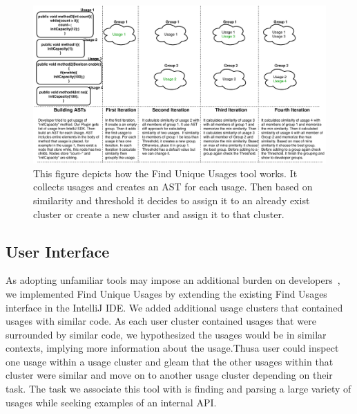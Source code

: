 \documentclass[conference]{IEEEtran}
\begin{document}
\begin{figure}
    \centering
    \includegraphics [width=\textwidth,keepaspectratio,clip]{figures/generlView.pdf}
    \caption{This figure depicts how the Find Unique Usages tool works. It collects usages and creates an AST for each usage. Then based on similarity and threshold it decides to assign it to an already exist cluster or create a new cluster and assign it to that cluster. }
\label{fig:general}
\end{figure}


\subsection{User Interface} 
As adopting unfamiliar tools may impose an additional burden on developers~\cite{adaption2002}, we implemented Find Unique Usages by extending the existing Find Usages interface in the IntelliJ IDE. We added additional usage clusters that contained usages with similar code. As each user cluster contained usages that were surrounded by similar code, we hypothesized the usages would be in similar contexts, implying more information about the usage.Thusa user could inspect one usage within a usage cluster and gleam that the other usages within that cluster were similar and move on to another usage cluster depending on their task. The task we associate this tool with is finding and parsing a large variety of usages while seeking examples of an internal API.
\end{document}
